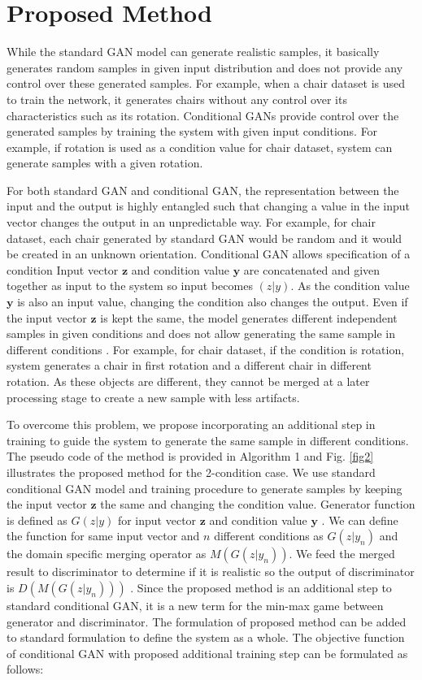 \documentclass[runningheads]{llncs}
\begin{document}
\section{Proposed Method}
\label{sect:method}
While the standard GAN model can generate realistic samples, it basically generates random samples in given input distribution and does not provide any control over these generated samples. For example, when a chair dataset is used to train the network, it generates chairs without any control over its characteristics such as its rotation. Conditional GANs provide control over the generated samples by training the system with given input conditions. For example, if rotation is used as a condition value for chair dataset, system can generate samples with a given rotation. 

	For both standard GAN and conditional GAN, the representation between the input and the output is highly entangled such that changing a value in the input vector changes the output in an unpredictable way. For example, for chair dataset, each chair generated by standard GAN would be random and it would be created in an unknown orientation. Conditional GAN allows specification of a condition Input vector $\mathbf{z}$ and condition value $\mathbf{y}$  are concatenated and given together as input to the system so input becomes $(z|y)$. As the condition value $\mathbf{y}$  is also an input value, changing the condition also changes the output. Even if the input vector $\mathbf{z}$ is kept the same, the model generates different independent samples in given conditions and does not allow generating the same sample in different conditions \cite{liu2016coupled,mao2017aligngan}. For example, for chair dataset, if the condition is rotation, system generates a chair in first rotation and a different chair in different rotation. As these objects are different, they cannot be merged at a later processing stage to create a new sample with less artifacts.
	
	To overcome this problem, we propose incorporating an additional step in training to guide the system to generate the same sample in different conditions. The pseudo code of the method is provided in Algorithm 1 and Fig. \ref{fig2} illustrates the proposed method for the 2-condition case.  We use standard conditional GAN model and training procedure to generate samples by keeping the input vector $\mathbf{z}$ the same and changing the condition value.  Generator function is defined as $G(z|y)$ for input vector $\mathbf{z}$ and condition value $\mathbf{y}$ . We can define the function for same input vector and $n$ different conditions as $G(z|y_n)$ and the domain specific merging operator as $M(G(z|y_n))$. We feed the merged result to discriminator to determine if it is realistic so the output of discriminator is $D(M(G(z|y_n)))$ . Since the proposed method is an additional step to standard conditional GAN, it is a new term for the min-max game between generator and discriminator. The formulation of proposed method can be added to standard formulation to define the system as a whole. The objective function of conditional GAN with proposed additional training step can be formulated as follows: 
\end{document}
